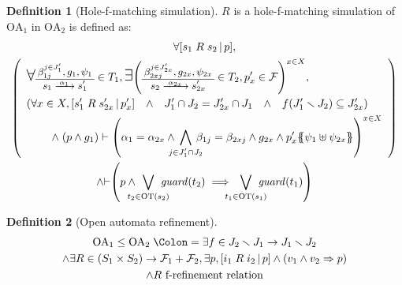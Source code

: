 \documentclass{article}
\theoremstyle{plain}
\theoremstyle{definition}
\newtheorem{defi}{Definition}
\newcommand\nmm[1]{\(\displaystyle #1\)} %
\newcommand\mpar[1]{{\left(#1\right)}}
\newcommand\mbrk[1]{{\left[#1\right]}}
\newcommand\mbrc[1]{{\left\{#1\right\}}}
\newcommand\psubst[1]{\mbrc{\!\!\mbrc{#1}\!\!}}
\newcommand\midbar{\,\middle|\,}
\newcommand\prel[4]{\mbrk{#2\mathrel{#1}#3\midbar #4}}
\newcommand\subbox[1]{{\makebox[.5\width]{\(\scriptstyle #1\)}}}
\newcommand\bigsymb[2][\Large]{\text{#1\nmm{#2}}}
\newcommand\defnotation{\DOTSB\;{\Colon=}\;}
\newcommand\nwedge{\DOTSB\;{\wedge}\;} %
\newcommand\qwedge{\DOTSB\quad{\wedge}\quad}
\newcommand\sat{{\vdash}} %
\newcommand\fformulae[1]{{\mathcal{F}}}
\newcommand\OT[6]{\text{\small\(%
	\setlength\arraycolsep{2pt}\everymath{\displaystyle}%
	\begin{array}{c}%
	#4,#5,#6 \\\hline
	#1\xrightarrow{\raisebox{-1.5pt}[.8\height][0pt]{\makebox[1.4\width]{\(\scriptstyle #3\)}}}#2
	\end{array}\)}}
\newcommand\OTx[4]{\OT{s_{#1}}{s'_{#1 #2}}{\alpha_{#1 #2}}{\beta_{#3 j}^{j \in J'_{#4}}}{g_{#1 #2}}{\psi_{#1 #2}}}
\begin{document}
\begin{defi}[Hole-f-matching simulation]
\(R\) is a hole-f-matching simulation of \(\mathrm{OA}_1\) in \(\mathrm{OA}_2\) is defined as:
\begin{multline*}
	\forall \prel{R}{s_1}{s_2}{p}, \\
	\mpar{\everymath{\displaystyle}\begin{array}{l}
		\bigsymb{\forall} \OTx{1}{}{1}{1} \in T_1, \bigsymb{\exists} \mpar{\OTx{2}{x}{2x}{2x} \in T_2, p'_x \in \fformulae{E}}^{x \in X}, \\[12pt]
		\mpar{\forall x \in X, \prel{R}{s'_1}{s'_{2x}}{p'_x} \qwedge J'_1 \cap J_2 = J'_{2x} \cap J_1 \qwedge f\mpar{J'_1 \setminus J_2} \subseteq J'_{2x}} \\[4pt]
		\qquad \nwedge \mpar{p \wedge g_1} \vdash \mpar{\alpha_1 = \alpha_{2x} \wedge \bigwedge_\subbox{j \in J'_1 \cap J_2} \beta_{1j} = \beta_{2xj} \wedge g_{2x} \wedge p'_x\psubst{\psi_1 \uplus \psi_{2x}}}^{x \in X} \\[12pt]
	\end{array}} \\
	\wedge \sat\mpar{p \wedge \bigvee_\subbox{t_2 \in \mathrm{OT}\mpar{s_2}} \mathit{guard}\mpar{t_2} \implies \bigvee_\subbox{t_1 \in \mathrm{OT}\mpar{s_1}} \mathit{guard}\mpar{t_1}}
\end{multline*}
\end{defi}

\begin{defi}[Open automata refinement]
\begin{multline*}
	\mathrm{OA}_1 \leq \mathrm{OA}_2 \defnotation \exists f \in J_2 \setminus J_1 \to J_1 \setminus J_2 \\
	\wedge \exists R \in \mpar{S_1 \times S_2} \to \fformulae{E}_1 + \fformulae{E}_2, \exists p, \prel{R}{i_1}{i_2}{p} \wedge \mpar{v_1 \wedge v_2 \Rightarrow p} \\
	\wedge R \text{ f-refinement relation}
\end{multline*}
\end{defi}
\end{document}
